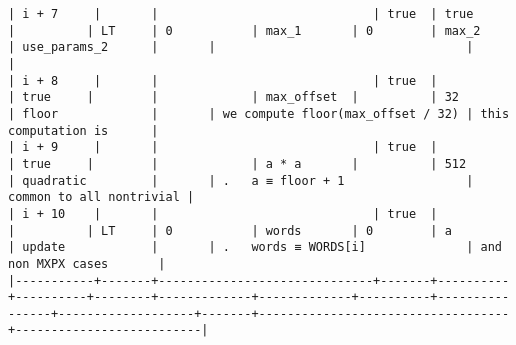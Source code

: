 \documentclass[varwidth=\maxdimen,margin=0.5cm,multi={verbatim}]{standalone}
\begin{document}
\begin{verbatim}
| i + 7     |       |                              | true  | true     |          | LT     | 0           | max_1       | 0        | max_2          | use_params_2      |       |                                   |                          |
| i + 8     |       |                              | true  |          | true     |        |             | max_offset  |          | 32             | floor             |       | we compute floor(max_offset / 32) | this computation is      |
| i + 9     |       |                              | true  |          | true     |        |             | a * a       |          | 512            | quadratic         |       | .   a ≡ floor + 1                 | common to all nontrivial |
| i + 10    |       |                              | true  |          |          | LT     | 0           | words       | 0        | a              | update            |       | .   words ≡ WORDS[i]              | and non MXPX cases       |
|-----------+-------+------------------------------+-------+----------+----------+--------+-------------+-------------+----------+----------------+-------------------+-------+-----------------------------------+--------------------------|

\end{verbatim}
\end{document}

